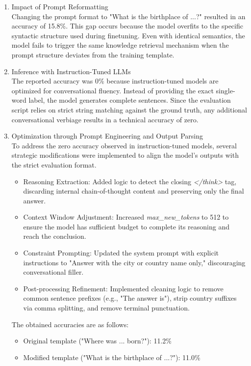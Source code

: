 \documentclass{article}
\begin{document}
\begin{enumerate}
    \item[a.] Impact of Prompt Reformatting \\
    Changing the prompt format to "What is the birthplace of ...?" resulted in an accuracy of 15.8\%. This gap occurs because the model overfits to the specific syntactic structure used during finetuning. Even with identical semantics, the model fails to trigger the same knowledge retrieval mechanism when the prompt structure deviates from the training template.

    \item[b.] Inference with Instruction-Tuned LLMs \\
    The reported accuracy was 0\% because instruction-tuned models are optimized for conversational fluency. Instead of providing the exact single-word label, the model generates complete sentences. Since the evaluation script relies on strict string matching against the ground truth, any additional conversational verbiage results in a technical accuracy of zero.

    \item[c.] Optimization through Prompt Engineering and Output Parsing \\
To address the zero accuracy observed in instruction-tuned models, several strategic modifications were implemented to align the model's outputs with the strict evaluation format. 

\begin{itemize}
    \item Reasoning Extraction: Added logic to detect the closing \textit{</think>} tag, discarding internal chain-of-thought content and preserving only the final answer.
    \item Context Window Adjustment: Increased \textit{max\_new\_tokens} to 512 to ensure the model has sufficient budget to complete its reasoning and reach the conclusion.
    \item Constraint Prompting: Updated the system prompt with explicit instructions to "Answer with the city or country name only," discouraging conversational filler.
    \item Post-processing Refinement: Implemented cleaning logic to remove common sentence prefixes (e.g., "The answer is"), strip country suffixes via comma splitting, and remove terminal punctuation.
\end{itemize}

The obtained accuracies are as follows:
\begin{itemize}
    \item Original template ("Where was ... born?"): 11.2\%
    \item Modified template ("What is the birthplace of ...?"): 11.0\%
\end{itemize}
\end{enumerate}
\end{document}
